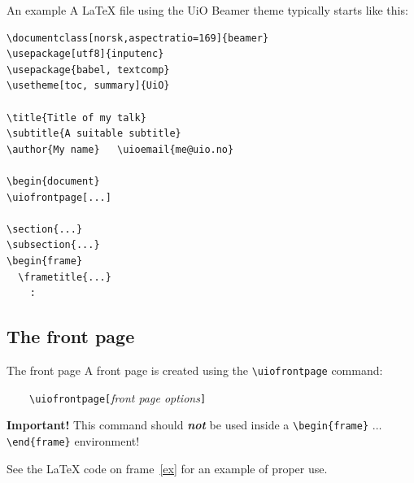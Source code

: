 \documentclass[UKenglish,aspectratio=169]{beamer}
\newcommand{\Dots}{\ensuremath{\ldots}}
\newcommand{\p}[1]{\texttt{#1}}
\newcommand{\pcmd}[1]{\p{\textbackslash #1}}
\newcommand{\penv}[1]{\pcmd{begin}\ppar{#1} \Dots{} \pcmd{end}\ppar{#1}}
\newcommand{\ppar}[1]{\p{\{#1\}}}
\begin{document}
\begin{frame}[fragile,label=ex]{An example}
  A \LaTeX{} file using the UiO Beamer theme typically starts like
  this:

  \medskip
  \begin{Verbatim}[fontsize=\scriptsize]
\documentclass[norsk,aspectratio=169]{beamer}
\usepackage[utf8]{inputenc}
\usepackage{babel, textcomp}
\usetheme[toc, summary]{UiO}

\title{Title of my talk}
\subtitle{A suitable subtitle}
\author{My name}   \uioemail{me@uio.no}

\begin{document}
\uiofrontpage[...]

\section{...}
\subsection{...}
\begin{frame}
  \frametitle{...}
    :
  \end{Verbatim}
\end{frame}

\subsection{The front page}

\begin{frame}{The front page}
  A front page is created using the \pcmd{uiofrontpage} command:

  \medskip
  ~~~~\pcmd{uiofrontpage}\p{[}\emph{front page options}\p{]}

  \bigskip
  \begin{alert}{\textbf{Important!} }
    This command should \textbf{\emph{not}} be used inside a
    \penv{frame} environment! 
  \end{alert}

  \medskip
  See the \LaTeX{} code on frame~\ref{ex} for an example of proper
  use.
\end{frame}
  
\end{document}
